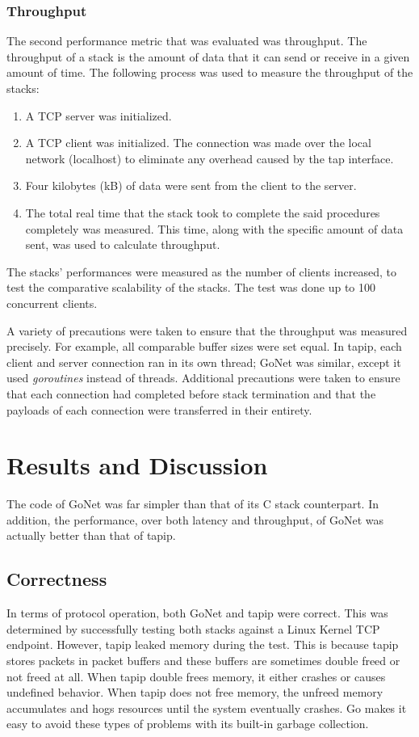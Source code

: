 \documentclass[twocolumn,10pt]{article}
\begin{document}
\subsubsection{Throughput}
The second performance metric that was evaluated was throughput. The throughput of a stack is the amount of data that it can send or receive in a given amount of time.
The following process was used to measure the throughput of the stacks:
\begin{enumerate}
\item A TCP server was initialized.
\item A TCP client was initialized. The connection was made over the local network (localhost) to eliminate any overhead caused by the tap interface. 
\item Four kilobytes (kB) of data were sent from the client to the server. 
\item The total real time that the stack took to complete the said procedures completely was measured. This time, along with the specific amount of data sent, was used to calculate throughput.
\end{enumerate}
The stacks' performances were measured as the number of clients increased, to test the comparative scalability of the stacks. The test was done up to 100 concurrent clients.

A variety of precautions were taken to ensure that the throughput was measured precisely. For example, all comparable buffer sizes were set equal. In tapip, each client and server connection ran in its own thread; GoNet was similar, except it used \textit{goroutines} instead of threads. Additional precautions were taken to ensure that each connection had completed before stack termination and that the payloads of each connection were transferred in their entirety. 

\section{Results and Discussion}
The code of GoNet was far simpler than that of its C stack counterpart. In addition, the performance, over both latency and throughput, of GoNet was actually better than that of tapip. 

\subsection{Correctness}
In terms of protocol operation, both GoNet and tapip were correct. This was determined by successfully testing both stacks against a Linux Kernel TCP endpoint. However, tapip leaked memory during the test. This is because tapip stores packets in packet buffers and these buffers are sometimes double freed or not freed at all. When tapip double frees memory, it either crashes or causes undefined behavior. When tapip does not free memory, the unfreed memory accumulates and hogs resources until the system eventually crashes. Go makes it easy to avoid these types of problems with its built-in garbage collection.
\end{document}
